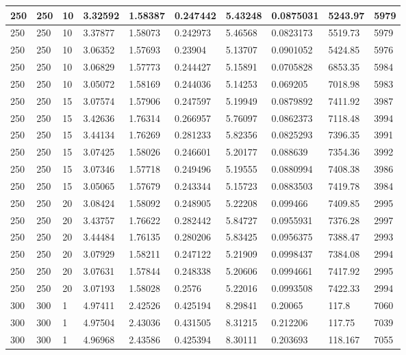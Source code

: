 \begin{landscape}
\begin{longtable}{ | l | l | l | l | l | l | l | l | l | l | }
250 & 250 & 10 & 3.32592 & 1.58387 & 0.247442 & 5.43248 & 0.0875031 & 5243.97 & 5979\\ \hline
250 & 250 & 10 & 3.37877 & 1.58073 & 0.242973 & 5.46568 & 0.0823173 & 5519.73 & 5979\\ \hline
250 & 250 & 10 & 3.06352 & 1.57693 & 0.23904 & 5.13707 & 0.0901052 & 5424.85 & 5976\\ \hline
250 & 250 & 10 & 3.06829 & 1.57773 & 0.244427 & 5.15891 & 0.0705828 & 6853.35 & 5984\\ \hline
250 & 250 & 10 & 3.05072 & 1.58169 & 0.244036 & 5.14253 & 0.069205 & 7018.98 & 5983\\ \hline
250 & 250 & 15 & 3.07574 & 1.57906 & 0.247597 & 5.19949 & 0.0879892 & 7411.92 & 3987\\ \hline
250 & 250 & 15 & 3.42636 & 1.76314 & 0.266957 & 5.76097 & 0.0862373 & 7118.48 & 3994\\ \hline
250 & 250 & 15 & 3.44134 & 1.76269 & 0.281233 & 5.82356 & 0.0825293 & 7396.35 & 3991\\ \hline
250 & 250 & 15 & 3.07425 & 1.58026 & 0.246601 & 5.20177 & 0.088639 & 7354.36 & 3992\\ \hline
250 & 250 & 15 & 3.07346 & 1.57718 & 0.249496 & 5.19555 & 0.0880994 & 7408.38 & 3986\\ \hline
250 & 250 & 15 & 3.05065 & 1.57679 & 0.243344 & 5.15723 & 0.0883503 & 7419.78 & 3984\\ \hline
250 & 250 & 20 & 3.08424 & 1.58092 & 0.248905 & 5.22208 & 0.099466 & 7409.85 & 2995\\ \hline
250 & 250 & 20 & 3.43757 & 1.76622 & 0.282442 & 5.84727 & 0.0955931 & 7376.28 & 2997\\ \hline
250 & 250 & 20 & 3.44484 & 1.76135 & 0.280206 & 5.83425 & 0.0956375 & 7388.47 & 2993\\ \hline
250 & 250 & 20 & 3.07929 & 1.58211 & 0.247122 & 5.21909 & 0.0998437 & 7384.08 & 2994\\ \hline
250 & 250 & 20 & 3.07631 & 1.57844 & 0.248338 & 5.20606 & 0.0994661 & 7417.92 & 2995\\ \hline
250 & 250 & 20 & 3.07193 & 1.58028 & 0.2576 & 5.22016 & 0.0993508 & 7422.33 & 2994\\ \hline
300 & 300 & 1 & 4.97411 & 2.42526 & 0.425194 & 8.29841 & 0.20065 & 117.8 & 7060\\ \hline
300 & 300 & 1 & 4.97504 & 2.43036 & 0.431505 & 8.31215 & 0.212206 & 117.75 & 7039\\ \hline
300 & 300 & 1 & 4.96968 & 2.43586 & 0.425394 & 8.30111 & 0.203693 & 118.167 & 7055\\ \hline

\end{longtable}
\end{landscape}
